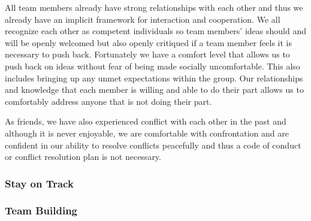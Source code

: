 \documentclass{article}
\begin{document}
\par{All team members already have strong relationships with each other and thus we already have an implicit framework for interaction and cooperation.
We all recognize each other as competent individuals so team members' ideas should and will be openly welcomed but also openly critiqued if a team
member feels it is necessary to push back. Fortunately we have a comfort level that allows us to push back on ideas without fear of being made socially
uncomfortable. This also includes bringing up any unmet expectations within the group. Our relationships and knowledge that each member is willing
and able to do their part allows us to comfortably address anyone that is not doing their part. \newline\newline\indent

As friends, we have also experienced conflict with each other in the past and although it is never enjoyable, we are comfortable with confrontation
and are confident in our ability to resolve conflicts peacefully and thus a code of conduct or conflict resolution plan is not necessary.}

\subsubsection*{Stay on Track}




\subsubsection*{Team Building}

\end{document}
